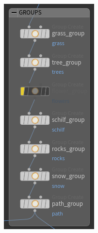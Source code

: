 \documentclass[paper=a4,fontsize=12pt,ngerman]{scrartcl}
\begin{document}
\begin{enumerate}
\begin{minipage}{0.14\textwidth}
		\includegraphics*[width=\textwidth]{graphics/Nedim25.png}

\end{minipage}
\end{enumerate}
\end{document}
